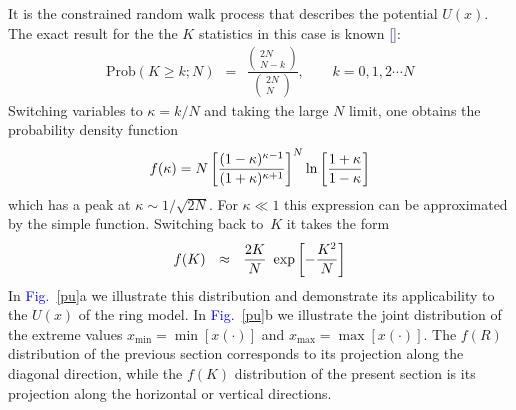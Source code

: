 \documentclass[aps,pre,floats,floatfix,twocolumn]{revtex4}
\newcommand{\mylabel}[1]{\label{#1}}
\newcommand{\beq}{\begin{eqnarray}}
\newcommand{\eeq}{\end{eqnarray}}
\newcommand{\be}[1]{\begin{eqnarray}\ifthenelse{#1=-1}
{\nonumber}{\ifthenelse{#1=0}{}{\mylabel{e#1}}}}
\newcommand{\ee}{\end{eqnarray}}
\newcommand{\Fig}[1]{\textcolor{blue}{Fig.}\!\!~\ref{#1}}
\renewcommand{\cite}[1]{\textcolor{blue}{[\onlinecite{#1}}]} %
\begin{document}
It is the constrained random walk process that describes the potential $U(x)$. 
The exact result for the the $K$ statistics in this case is known \cite{dwass}:
%
\beq
\text{Prob}(K \geq k;N) \ \ = \ \  
\frac
{\left(\begin{array}{c}2N \\N-k\end{array}\right)}
{\left(\begin{array}{c}2N \\N\end{array}\right)},  
\ \ \ \ \ \ \ \ \ k = 0,1,2 \cdots N
\eeq
%
Switching variables to $\kappa=k/N$ and taking the large $N$ limit, 
one obtains the probability density function 
%
\be{50}
f(\kappa) = 
N \left[\frac{(1-\kappa)^{\kappa-1}}{(1+\kappa)^{\kappa+1}}\right]^N 
\ln \left[\frac{1+\kappa}{1-\kappa} \right] 
\ee
%
which has a peak at $\kappa \sim 1/\sqrt{2N}$.
For $\kappa\ll1$ this expression can be approximated 
by the simple function. Switching back to~$K$ 
it takes the form 
%
\be{51}
f(K) \ \ \approx \ \ \frac{2K}{N} \ \exp\left[-\frac{K^2}{N}\right]
\ee
%
In \Fig{pu}a we illustrate this distribution and 
demonstrate its applicability to the ${U(x)}$ of the ring model.
In \Fig{pu}b we illustrate the joint distribution of the 
extreme values ${x_{\text{min}}=\min[x(\cdot)]}$ and ${x_{\text{max}}=\max[x(\cdot)]}$.
The $f(R)$ distribution of the previous section corresponds to its projection 
along the diagonal direction, while the $f(K)$ distribution of the present section 
is its projection along the horizontal or vertical directions. 
\end{document}
